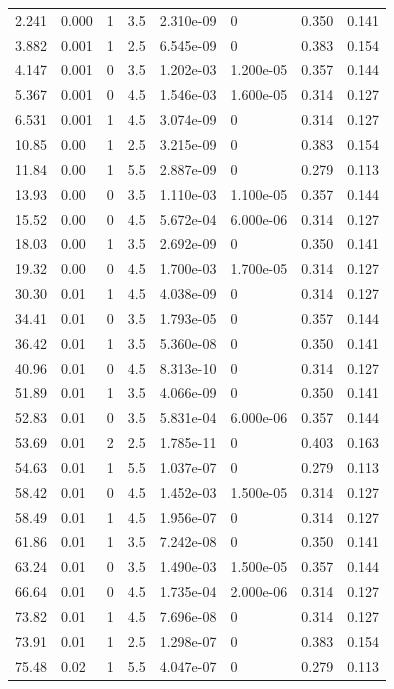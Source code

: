 \documentclass[preview]{standalone}
\begin{document}
{{\begin{tabular}{L{1.2cm}C{1.2cm} C{0.3cm}C{0.5cm} C{1.4cm}C{1.4cm} C{1.4cm}C{1.4cm}}
  2.241  &  0.000  & 1     & 3.5 &  2.310e-09  & 0  & 0.350 &  0.141   \\ 
  3.882  &  0.001  & 1     & 2.5 &  6.545e-09  & 0  & 0.383 &  0.154   \\ 
  4.147  &  0.001  & 0     & 3.5 &  1.202e-03  & 1.200e-05  & 0.357 &  0.144   \\ 
  5.367  &  0.001  & 0     & 4.5 &  1.546e-03  & 1.600e-05  & 0.314 &  0.127   \\ 
  6.531  &  0.001  & 1     & 4.5 &  3.074e-09  & 0  & 0.314 &  0.127   \\ 
  10.85  &  0.00  & 1     & 2.5 &  3.215e-09  & 0  & 0.383 &  0.154   \\ 
  11.84  &  0.00  & 1     & 5.5 &  2.887e-09  & 0  & 0.279 &  0.113   \\ 
  13.93  &  0.00  & 0     & 3.5 &  1.110e-03  & 1.100e-05  & 0.357 &  0.144   \\ 
  15.52  &  0.00  & 0     & 4.5 &  5.672e-04  & 6.000e-06  & 0.314 &  0.127   \\ 
  18.03  &  0.00  & 1     & 3.5 &  2.692e-09  & 0  & 0.350 &  0.141   \\ 
  19.32  &  0.00  & 0     & 4.5 &  1.700e-03  & 1.700e-05  & 0.314 &  0.127   \\ 
  30.30  &  0.01  & 1     & 4.5 &  4.038e-09  & 0  & 0.314 &  0.127   \\ 
  34.41  &  0.01  & 0     & 3.5 &  1.793e-05  & 0  & 0.357 &  0.144   \\ 
  36.42  &  0.01  & 1     & 3.5 &  5.360e-08  & 0  & 0.350 &  0.141   \\ 
  40.96  &  0.01  & 0     & 4.5 &  8.313e-10  & 0  & 0.314 &  0.127   \\ 
  51.89  &  0.01  & 1     & 3.5 &  4.066e-09  & 0  & 0.350 &  0.141   \\ 
  52.83  &  0.01  & 0     & 3.5 &  5.831e-04  & 6.000e-06  & 0.357 &  0.144   \\ 
  53.69  &  0.01  & 2     & 2.5 &  1.785e-11  & 0  & 0.403 &  0.163   \\ 
  54.63  &  0.01  & 1     & 5.5 &  1.037e-07  & 0  & 0.279 &  0.113   \\ 
  58.42  &  0.01  & 0     & 4.5 &  1.452e-03  & 1.500e-05  & 0.314 &  0.127   \\ 
  58.49  &  0.01  & 1     & 4.5 &  1.956e-07  & 0  & 0.314 &  0.127   \\ 
  61.86  &  0.01  & 1     & 3.5 &  7.242e-08  & 0  & 0.350 &  0.141   \\ 
  63.24  &  0.01  & 0     & 3.5 &  1.490e-03  & 1.500e-05  & 0.357 &  0.144   \\ 
  66.64  &  0.01  & 0     & 4.5 &  1.735e-04  & 2.000e-06  & 0.314 &  0.127   \\ 
  73.82  &  0.01  & 1     & 4.5 &  7.696e-08  & 0  & 0.314 &  0.127   \\ 
  73.91  &  0.01  & 1     & 2.5 &  1.298e-07  & 0  & 0.383 &  0.154   \\ 
  75.48  &  0.02  & 1     & 5.5 &  4.047e-07  & 0  & 0.279 &  0.113   \\ 
\hline 
\end{tabular} 

}}
\end{document}
